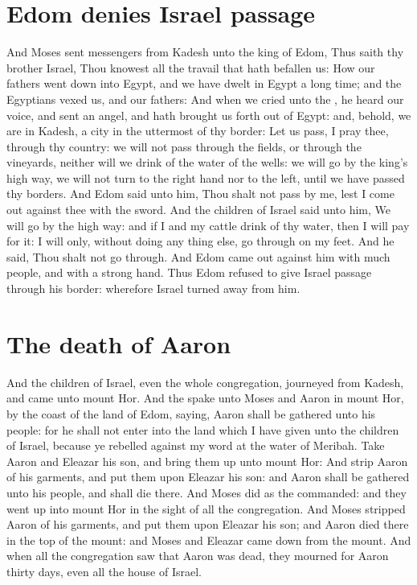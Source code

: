 \begin{biblechapter}
\section*{Edom denies Israel passage}
\verse And Moses sent messengers from Kadesh unto the king of Edom, Thus saith thy brother Israel, Thou knowest all the travail that hath befallen us:
\verse How our fathers went down into Egypt, and we have dwelt in Egypt a long time; and the Egyptians vexed us, and our fathers:
\verse And when we cried unto the \LORD, he heard our voice, and sent an angel, and hath brought us forth out of Egypt: and, behold, we are in Kadesh, a city in the uttermost of thy border:
\verse Let us pass, I pray thee, through thy country: we will not pass through the fields, or through the vineyards, neither will we drink of the water of the wells: we will go by the king's high way, we will not turn to the right hand nor to the left, until we have passed thy borders.
\verse And Edom said unto him, Thou shalt not pass by me, lest I come out against thee with the sword.
\verse And the children of Israel said unto him, We will go by the high way: and if I and my cattle drink of thy water, then I will pay for it: I will only, without doing any thing else, go through on my feet.
\verse And he said, Thou shalt not go through. And Edom came out against him with much people, and with a strong hand.
\verse Thus Edom refused to give Israel passage through his border: wherefore Israel turned away from him.
\section*{The death of Aaron}
\verse And the children of Israel, even the whole congregation, journeyed from Kadesh, and came unto mount Hor.
\verse And the \LORD spake unto Moses and Aaron in mount Hor, by the coast of the land of Edom, saying,
\verse Aaron shall be gathered unto his people: for he shall not enter into the land which I have given unto the children of Israel, because ye rebelled against my word at the water of Meribah.
\verse Take Aaron and Eleazar his son, and bring them up unto mount Hor:
\verse And strip Aaron of his garments, and put them upon Eleazar his son: and Aaron shall be gathered unto his people, and shall die there.
\verse And Moses did as the \LORD commanded: and they went up into mount Hor in the sight of all the congregation.
\verse And Moses stripped Aaron of his garments, and put them upon Eleazar his son; and Aaron died there in the top of the mount: and Moses and Eleazar came down from the mount.
\verse And when all the congregation saw that Aaron was dead, they mourned for Aaron thirty days, even all the house of Israel.
\end{biblechapter}

